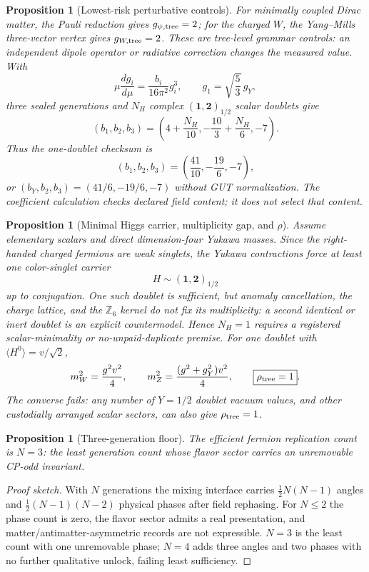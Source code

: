 \documentclass[11pt]{article}
\theoremstyle{plain}
\newtheorem{proposition}[theorem]{Proposition}
\theoremstyle{definition}
\theoremstyle{remark}
\newenvironment{proofsketch}{\begin{proof}[Proof sketch]}{\end{proof}}
\begin{document}
\begin{proposition}[Lowest-risk perturbative controls]
For minimally coupled Dirac matter, the Pauli reduction gives \(g_{\psi,{\rm tree}}=2\); for the charged \(W\), the Yang--Mills three-vector vertex gives \(g_{W,{\rm tree}}=2\). These are tree-level grammar controls: an independent dipole operator or radiative correction changes the measured value. With
\[
\mu\frac{dg_i}{d\mu}=\frac{b_i}{16\pi^2}g_i^3,
\qquad
g_1=\sqrt{\frac53}\,g_Y,
\]
three sealed generations and \(N_H\) complex \((\mathbf1,\mathbf2)_{1/2}\) scalar doublets give
\[
(b_1,b_2,b_3)
=
\left(4+\frac{N_H}{10},-\frac{10}{3}+\frac{N_H}{6},-7\right).
\]
Thus the one-doublet checksum is
\[
\boxed{(b_1,b_2,b_3)=\left(\frac{41}{10},-\frac{19}{6},-7\right)},
\]
or \((b_Y,b_2,b_3)=(41/6,-19/6,-7)\) without GUT normalization. The coefficient calculation checks declared field content; it does not select that content.
\end{proposition}

\begin{proposition}[Minimal Higgs carrier, multiplicity gap, and \(\rho\)]
Assume elementary scalars and direct dimension-four Yukawa masses. Since the right-handed charged fermions are weak singlets, the Yukawa contractions force at least one color-singlet carrier
\[
H\sim(\mathbf1,\mathbf2)_{1/2}
\]
up to conjugation. One such doublet is sufficient, but anomaly cancellation, the charge lattice, and the \(\mathbb Z_6\) kernel do not fix its multiplicity: a second identical or inert doublet is an explicit countermodel. Hence \(N_H=1\) requires a registered scalar-minimality or no-unpaid-duplicate premise. For one doublet with \(\langle H^0\rangle=v/\sqrt2\),
\[
m_W^2=\frac{g^2v^2}{4},
\qquad
m_Z^2=\frac{(g^2+g_Y^2)v^2}{4},
\qquad
\boxed{\rho_{\rm tree}=1}.
\]
The converse fails: any number of \(Y=1/2\) doublet vacuum values, and other custodially arranged scalar sectors, can also give \(\rho_{\rm tree}=1\).
\end{proposition}

\begin{proposition}[Three-generation floor]
The efficient fermion replication count is \(N=3\): the least generation count whose flavor sector carries an unremovable CP-odd invariant.
\end{proposition}

\begin{proofsketch}
With \(N\) generations the mixing interface carries \(\tfrac{1}{2}N(N-1)\) angles and \(\tfrac{1}{2}(N-1)(N-2)\) physical phases after field rephasing. For \(N\le 2\) the phase count is zero, the flavor sector admits a real presentation, and matter/antimatter-asymmetric records are not expressible. \(N=3\) is the least count with one unremovable phase; \(N=4\) adds three angles and two phases with no further qualitative unlock, failing least sufficiency.
\end{proofsketch}
\end{document}
